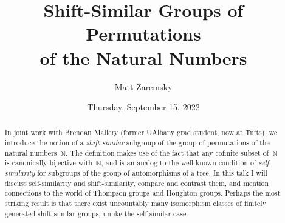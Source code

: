 \documentclass{UAmathtalk}
\author{Matt Zaremsky}
\title{Shift-Similar Groups of Permutations\\of the Natural Numbers}
\date{Thursday, September 15, 2022}
\begin{document}
\maketitle

\begin{abstract}
In joint work with Brendan Mallery (former UAlbany grad student, now at Tufts), we introduce the notion of a \emph{shift-similar} subgroup of the group of permutations of the natural numbers~$\mathbb{N}$. The definition makes use of the fact that any cofinite subset of~$\mathbb{N}$ is canonically bijective with~$\mathbb{N}$, and is an analog to the well-known condition of \emph{self-similarity} for subgroups of the group of automorphisms of a tree. In this talk I will discuss self-similarity and shift-similarity, compare and contrast them, and mention connections to the world of Thompson groups and Houghton groups. Perhaps the most striking result is that there exist uncountably many isomorphism classes of finitely generated shift-similar groups, unlike the self-similar case.
\end{abstract}
\end{document}
